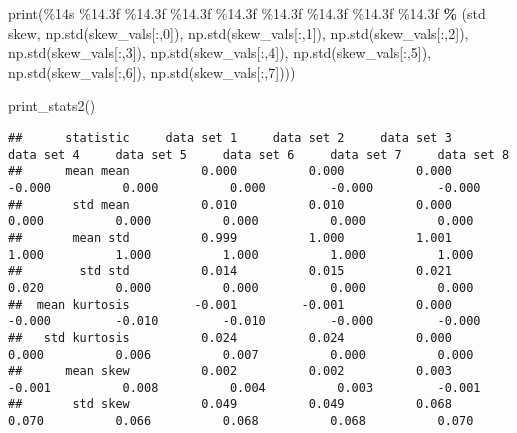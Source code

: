 \documentclass[
]{book}
\newenvironment{Shaded}{\begin{snugshade}}{\end{snugshade}}
\newcommand{\BuiltInTok}[1]{#1}
\newcommand{\DecValTok}[1]{\textcolor[rgb]{0.00,0.00,0.81}{#1}}
\newcommand{\NormalTok}[1]{#1}
\newcommand{\OperatorTok}[1]{\textcolor[rgb]{0.81,0.36,0.00}{\textbf{#1}}}
\newcommand{\SpecialCharTok}[1]{\textcolor[rgb]{0.00,0.00,0.00}{#1}}
\newcommand{\StringTok}[1]{\textcolor[rgb]{0.31,0.60,0.02}{#1}}
\begin{document}
\begin{Shaded}
\begin{Highlighting}[]
  \BuiltInTok{print}\NormalTok{(}\StringTok{\textquotesingle{}}\SpecialCharTok{\%14s}\StringTok{ }\SpecialCharTok{\%14.3f}\StringTok{ }\SpecialCharTok{\%14.3f}\StringTok{ }\SpecialCharTok{\%14.3f}\StringTok{ }\SpecialCharTok{\%14.3f}\StringTok{ }\SpecialCharTok{\%14.3f}\StringTok{ }\SpecialCharTok{\%14.3f}\StringTok{ }\SpecialCharTok{\%14.3f}\StringTok{ }\SpecialCharTok{\%14.3f}\StringTok{\textquotesingle{}} \OperatorTok{\%}\NormalTok{ (}\StringTok{\textquotesingle{}std skew\textquotesingle{}}\NormalTok{, np.std(skew\_vals[:,}\DecValTok{0}\NormalTok{]), np.std(skew\_vals[:,}\DecValTok{1}\NormalTok{]), np.std(skew\_vals[:,}\DecValTok{2}\NormalTok{]), np.std(skew\_vals[:,}\DecValTok{3}\NormalTok{]), np.std(skew\_vals[:,}\DecValTok{4}\NormalTok{]), np.std(skew\_vals[:,}\DecValTok{5}\NormalTok{]), np.std(skew\_vals[:,}\DecValTok{6}\NormalTok{]), np.std(skew\_vals[:,}\DecValTok{7}\NormalTok{])))}
  
\NormalTok{print\_stats2()  }
\end{Highlighting}
\end{Shaded}

\begin{verbatim}
##      statistic     data set 1     data set 2     data set 3     data set 4     data set 5     data set 6     data set 7     data set 8
##      mean mean          0.000          0.000          0.000         -0.000          0.000          0.000         -0.000         -0.000
##       std mean          0.010          0.010          0.000          0.000          0.000          0.000          0.000          0.000
##       mean std          0.999          1.000          1.001          1.000          1.000          1.000          1.000          1.000
##        std std          0.014          0.015          0.021          0.020          0.000          0.000          0.000          0.000
##  mean kurtosis         -0.001         -0.001          0.000         -0.000         -0.010         -0.010         -0.000         -0.000
##   std kurtosis          0.024          0.024          0.000          0.000          0.006          0.007          0.000          0.000
##      mean skew          0.002          0.002          0.003         -0.001          0.008          0.004          0.003         -0.001
##       std skew          0.049          0.049          0.068          0.070          0.066          0.068          0.068          0.070
\end{verbatim}

  
\end{document}
